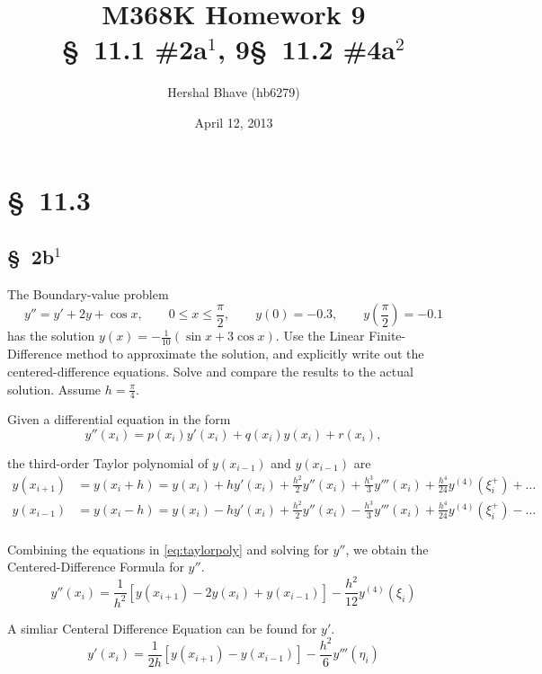 \documentclass[12pt]{article}
\title{M368K Homework 9 \\
  \normalsize{\S~11.1 \#2a$^1$, 9\quad \S~11.2 \#4a$^2$}}
\author{Hershal Bhave (hb6279)}
\date{April 12, 2013}
\begin{document}
\maketitle

\section{\S~11.3}
\subsection{\S~2b$^1$}

The Boundary-value problem 
$$ y'' = y'+2y+\cos x, \qquad 0\leq x\leq\frac{\pi}{2},\qquad y(0)=-0.3,\qquad y\left(\frac{\pi}{2}\right)=-0.1 $$
has the solution $y(x) = -\frac{1}{10}(\sin x + 3\cos x)$. Use the
Linear Finite-Difference method to approximate the solution, and
explicitly write out the centered-difference equations. Solve and
compare the results to the actual solution. Assume $h=\frac{\pi}{4}$.

Given a differential equation in the form
\begin{equation}
  \label{eq:gendiff}
  y''(x_i)=p(x_i)y'(x_i)+q(x_i)y(x_i)+r(x_i),
\end{equation}

the third-order Taylor polynomial of $y(x_{i-1})$ and $y(x_{i-1})$ are
\begin{equation}
  \label{eq:taylorpoly}
  \begin{aligned}
    y(x_{i+1}) &= y(x_i+h) = y(x_i) + hy'(x_i)+\frac{h^2}{2}y''(x_i) + \frac{h^3}{3}y'''(x_i)+\frac{h^4}{24}y^{(4)}(\xi_i^+)+\ldots\\
    y(x_{i-1}) &= y(x_i-h) = y(x_i) - hy'(x_i)+\frac{h^2}{2}y''(x_i)
    - \frac{h^3}{3}y'''(x_i)+\frac{h^4}{24}y^{(4)}(\xi_i^+)-\ldots \\
  \end{aligned}
\end{equation}

Combining the equations in \cref{eq:taylorpoly} and solving for $y''$, we obtain the
Centered-Difference Formula for $y''$.
\begin{equation}
  \label{eq:centdiffypp}
  y''(x_i)=\frac{1}{h^2}[y(x_{i+1})-2y(x_i)+y(x_{i-1})]-\frac{h^2}{12}y^{(4)}(\xi_i) 
\end{equation}

A simliar Centeral Difference Equation can be found for $y'$.
\begin{equation}
  \label{eq:centdiffyp}
  y'(x_i)=\frac{1}{2h}[y(x_{i+1})-y(x_{i-1})]-\frac{h^2}{6}y'''(\eta_i)
\end{equation}
\end{document}
